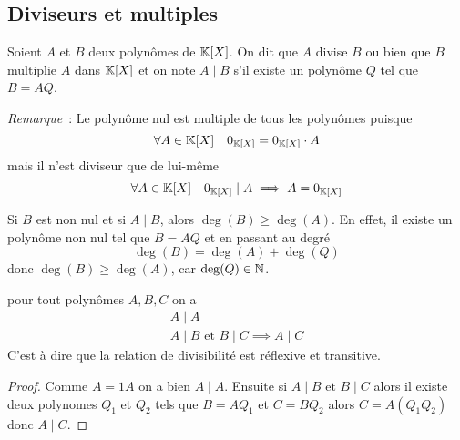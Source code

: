 \subsection{Diviseurs et multiples}

\begin{defdef}
  Soient \(A\) et \(B\) deux polynômes de \(\mathbb{K}[X]\). On dit que \(A\) divise 
  \(B\) ou bien que \(B\) multiplie \(A\) dans \(\mathbb{K}[X]\) et on note \(A\mid{}B\) 
  s'il existe un polynôme \(Q\) tel que \(B = AQ\).
\end{defdef}

\emph{Remarque}~: Le polynôme nul est multiple de tous les polynômes puisque
\begin{equation}
  \forall A \in \mathbb{K}[X] \quad 0_{\mathbb{K}[X]} = 0_{\mathbb{K}[X]} \cdot A
\end{equation}
mais il n'est diviseur que de lui-même
\begin{equation}
  \forall A \in \mathbb{K}[X] \quad 0_{\mathbb{K}[X]}\mid{}A \implies A = 0_{\mathbb{K}[X]}
\end{equation}

Si \(B\) est non nul et si \(A\mid{}B\), alors \(\deg(B) \geqslant \deg(A)\). En 
effet, il existe un polynôme non nul tel que \(B = AQ\) et en passant au degré
\begin{equation}
  \deg(B) = \deg(A)+\deg(Q)
\end{equation}
donc \(\deg(B) \geqslant \deg(A)\), car \(\deg(Q)\in \mathbb{N}\).

\begin{prop}
  pour tout polynômes \(A,B,C\) on a
  \begin{align}
    A\mid{}A \\
    A\mid{}B \text{~et~} B\mid{}C \implies A\mid{}C
  \end{align}
  C'est à dire que la relation de divisibilité est réflexive et transitive.
\end{prop}
\begin{proof}
  Comme \(A = 1 A\) on a bien \(A\mid{}A\). Ensuite si \(A\mid{}B \text{~et~} 
  B\mid{}C\) alors il existe deux polynomes \(Q_1\) et \(Q_2\) tels que 
  \(B = AQ_1\) et \(C = BQ_2\) alors \(C = A(Q_1Q_2)\) donc \(A\mid{}C\).
\end{proof}

